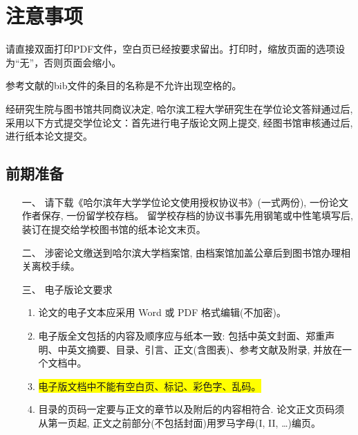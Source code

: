 
%
%
%

\chapter{注意事项}
\label{chap08}

请直接双面打印PDF文件，空白页已经按要求留出。打印时，缩放页面的选项设
为“无”，否则页面会缩小。

参考文献的bib文件的条目的名称是不允许出现空格的。

经研究生院与图书馆共同商议决定, 哈尔滨工程大学研究生在学位论文答辩通过后,
采用以下方式提交学位论文：首先进行电子版论文网上提交, 经图书馆审核通过后, 进行纸本论文提交。

\section{前期准备}
\begin{itemize}
  \item[一、] 请下载《哈尔滨年大学学位论文使用授权协议书》(一式两份), 一份论文作者保存, 一份留学校存档。
    留学校存档的协议书事先用钢笔或中性笔填写后,  装订在提交给学校图书馆的纸本论文末页。

    \item[二、]涉密论文缴送到哈尔滨大学档案馆, 由档案馆加盖公章后到图书馆办理相关离校手续。

    \item[三、]电子版论文要求
\begin{enumerate}[1.]
  \item 论文的电子文本应采用 Word 或 PDF 格式编辑(不加密)。
  \item 电子版全文包括的内容及顺序应与纸本一致: 包括中英文封面、郑重声明、中英文摘要、目录、引言、正文(含图表)、参考文献及附录, 并放在一个文档中。
  \item \colorbox{yellow}{电子版文档中不能有空白页、标记、彩色字、乱码。}
  \item 目录的页码一定要与正文的章节以及附后的内容相符合. 论文正文页码须从第一页起, 正文之前部分(不包括封面)用罗马字母(I, II, \dots)编页。
\end{enumerate}
\end{itemize}

